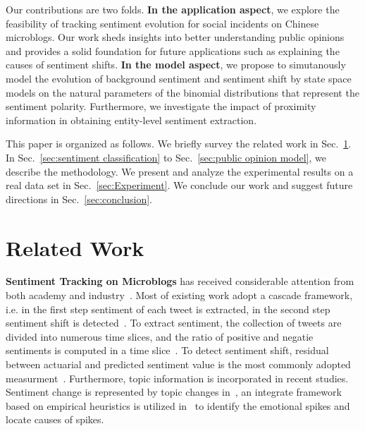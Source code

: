 \documentclass[runningheads]{llncs}
\begin{document}
Our contributions are two folds. 
\textbf{In the application aspect}, we explore the feasibility of tracking sentiment evolution for social incidents on Chinese microblogs. Our work sheds insights into better understanding public opinions and provides a solid foundation for future applications such as explaining the causes of sentiment shifts. 
\textbf{In the model aspect}, we propose to simutanously model the evolution of background sentiment and sentiment shift by state space models on the natural parameters of the binomial distributions that represent the sentiment polarity. 
Furthermore, we investigate the impact of proximity information in obtaining entity-level sentiment extraction.


This paper is organized as follows. We briefly survey the related work in Sec.~\ref{sec:related}. In Sec.~\ref{sec:sentiment classification} to Sec.~\ref{sec:public opinion model}, we describe the methodology. We present and analyze the experimental results on a real data set in Sec.~\ref{sec:Experiment}. We conclude our work and suggest future directions in Sec.~\ref{sec:conclusion}.


\section{Related Work}\label{sec:related}
\textbf{Sentiment Tracking on Microblogs} has received considerable attention from both academy and industry~\cite{Giachanou2016sentichange,Giachanou2017sentichange,Giachanou2016sentitime,An2014sentimentchange,Bollen2011sentimentchange,Tan2014topic,Montero2016sentimentchange}. Most of existing work adopt a cascade framework, i.e. in the first step sentiment of each tweet is extracted, in the second step sentiment shift is detected~\cite{Giachanou2016sentichange,Giachanou2017sentichange,Giachanou2016sentitime,An2014sentimentchange,Bollen2011sentimentchange,Tan2014topic}. To extract sentiment, the collection of tweets are divided into numerous time slices, and the ratio of positive and negatie sentiments is computed in a time slice~\cite{Giachanou2017sentichange,Giachanou2016sentitime,An2014sentimentchange,Bollen2011sentimentchange}. 
To detect sentiment shift, residual between actuarial and predicted sentiment value is the most commonly adopted measurment~\cite{Giachanou2016sentichange,Giachanou2016sentitime}. 
Furthermore, topic information is incorporated in recent studies. Sentiment change is represented by topic changes in~\cite{Tan2014topic}, an integrate framework based on empirical heuristics is utilized in~\cite{Montero2016sentimentchange} to identify
the emotional spikes and locate causes of spikes.%
\end{document}
